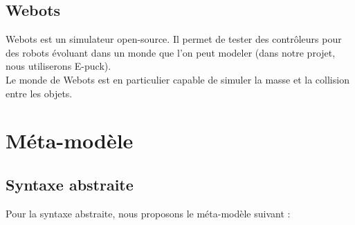 \documentclass[a4paper,12pt]{article}
\begin{document}
\subsection{Webots}
Webots est un simulateur open-source. Il permet de tester des contrôleurs pour des robots évoluant dans un monde que l’on peut modeler (dans notre projet, nous utiliserons E-puck). 
\\Le monde de Webots est en particulier capable de simuler la masse et la collision entre les objets.

\newpage
\section{Méta-modèle}
\subsection{Syntaxe abstraite}
Pour la syntaxe abstraite, nous proposons le méta-modèle suivant : 
\end{document}
